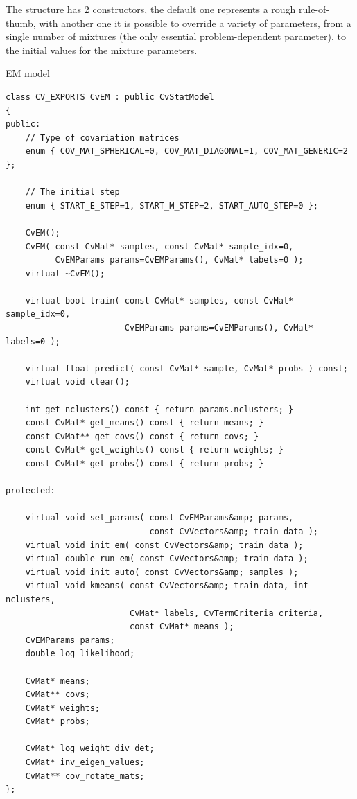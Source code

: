 The structure has 2 constructors, the default one represents a rough rule-of-thumb, with another one it is possible to override a variety of parameters, from a single number of mixtures (the only essential problem-dependent parameter), to the initial values for the mixture parameters.



EM model

\begin{lstlisting}
class CV_EXPORTS CvEM : public CvStatModel
{
public:
    // Type of covariation matrices
    enum { COV_MAT_SPHERICAL=0, COV_MAT_DIAGONAL=1, COV_MAT_GENERIC=2 };

    // The initial step
    enum { START_E_STEP=1, START_M_STEP=2, START_AUTO_STEP=0 };

    CvEM();
    CvEM( const CvMat* samples, const CvMat* sample_idx=0,
          CvEMParams params=CvEMParams(), CvMat* labels=0 );
    virtual ~CvEM();

    virtual bool train( const CvMat* samples, const CvMat* sample_idx=0,
                        CvEMParams params=CvEMParams(), CvMat* labels=0 );

    virtual float predict( const CvMat* sample, CvMat* probs ) const;
    virtual void clear();

    int get_nclusters() const { return params.nclusters; }
    const CvMat* get_means() const { return means; }
    const CvMat** get_covs() const { return covs; }
    const CvMat* get_weights() const { return weights; }
    const CvMat* get_probs() const { return probs; }

protected:

    virtual void set_params( const CvEMParams&amp; params,
                             const CvVectors&amp; train_data );
    virtual void init_em( const CvVectors&amp; train_data );
    virtual double run_em( const CvVectors&amp; train_data );
    virtual void init_auto( const CvVectors&amp; samples );
    virtual void kmeans( const CvVectors&amp; train_data, int nclusters,
                         CvMat* labels, CvTermCriteria criteria,
                         const CvMat* means );
    CvEMParams params;
    double log_likelihood;

    CvMat* means;
    CvMat** covs;
    CvMat* weights;
    CvMat* probs;

    CvMat* log_weight_div_det;
    CvMat* inv_eigen_values;
    CvMat** cov_rotate_mats;
};
\end{lstlisting}



